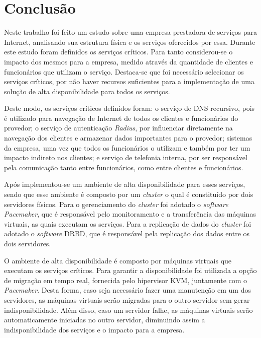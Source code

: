 \chapter{Conclusão}
\label{cap:conclusao}

Neste trabalho foi feito um estudo sobre uma empresa prestadora de serviços para Internet, analisando sua estrutura física e os serviços oferecidos 
por essa. Durante este estudo foram definidos os serviços críticos. Para tanto considerou-se o impacto dos mesmos para a empresa, medido através
da quantidade de clientes e funcionários que utilizam o serviço. Destaca-se que foi necessário selecionar os serviços críticos, por não 
haver recursos suficientes para a implementação de uma solução de alta disponibilidade para todos os serviços.

Deste modo, os serviços críticos definidos foram: o serviço de \ac{DNS} recursivo, pois é utilizado para navegação de Internet de todos os clientes 
e funcionários do provedor; o serviço de autenticação \textit{Radius}, por influenciar diretamente na navegação dos clientes e armazenar dados 
importantes para o provedor; sistemas da empresa, uma vez que todos os funcionários o utilizam e também por ter um impacto indireto nos 
clientes; e serviço de telefonia interna, por ser responsável pela comunicação tanto entre funcionários, como entre clientes e funcionários.

Após implementou-se um ambiente de alta disponibilidade para esses serviços, sendo que esse ambiente é composto por um \textit{cluster} o qual é 
constituído por dois servidores físicos. Para o gerenciamento do \textit{cluster} foi adotado o \textit{software} \textit{Pacemaker}, que é 
responsável pelo monitoramento e a transferência das máquinas virtuais, as quais executam os serviços. Para a replicação de dados 
do \textit{cluster} foi adotado o \textit{software} \ac{DRBD}, que é responsável pela replicação dos dados entre os dois servidores.

O ambiente de alta disponibilidade é composto por máquinas virtuais que executam os serviços críticos. Para garantir a disponibilidade 
foi utilizada a opção de migração em tempo real, fornecida pelo hipervisor \ac{KVM}, juntamente com o \textit{Pacemaker}. Desta forma, caso seja 
necessário fazer uma manutenção em um dos servidores, as máquinas virtuais serão migradas para o outro servidor sem gerar indisponibilidade.
Além disso, caso um servidor falhe, as máquinas virtuais serão automaticamente iniciadas no outro servidor, diminuindo assim a indisponibilidade
dos serviços e o impacto para a empresa.

